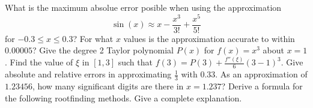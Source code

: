 \documentclass[addpoints, 11pt]{exam}
\begin{document}
\begin{questions}
\question What is the maximum absolue error posible when using the approximation
$$
\sin(x) \approx x - \frac{x^3}{3!}+\frac{x^5}{5!}
$$
for $-0.3 \leq x \leq 0.3$? For what $x$ values is the approximation accurate to within $0.00005$?
\question Give the degree 2 Taylor polynomial $P(x)$ for $f(x)=x^3$ about $x=1$. Find the value of $\xi$ in $[1,3]$ such that $f(3)=P(3)+\frac{f''(\xi)}{6}(3-1)^3$.
\question Give absolute and relative errors in approximating $\frac{1}{3}$ with $0.33$.
\question As an approximation of $1.23456$, how many significant digits are there in $x = 1.237$? \pagebreak
\question Derive a formula for the following rootfinding methods. Give a complete explanation.
\end{questions}
\end{document}
